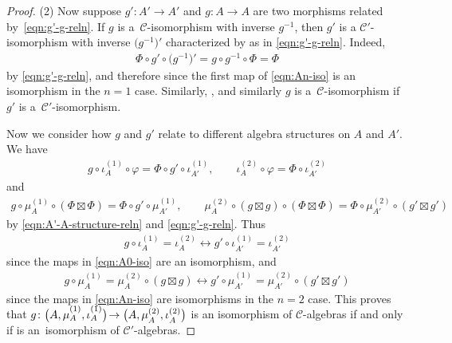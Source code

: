 \documentclass[10pt,a4paper]{amsart}
\begin{document}
\begin{proof}
(2) Now suppose $g'\colon A'\rightarrow A'$ and $g\colon A\rightarrow A$ are two morphisms related by~\eqref{eqn:g'-g-reln}. If $g$ is a~$\mathcal{C}$-isomorphism with inverse $g^{-1}$, then $g'$ is a $\mathcal{C}'$-isomorphism with inverse $\bigl(g^{-1}\bigr)'$ characterized by  as in \eqref{eqn:g'-g-reln}. Indeed,
\begin{gather*}
\Phi\circ g'\circ\bigl(g^{-1}\bigr)' =g\circ g^{-1}\circ\Phi =\Phi
\end{gather*}
by \eqref{eqn:g'-g-reln}, and therefore  since the first map of \eqref{eqn:An-iso} is an isomorphism in the $n=1$ case. Similarly, , and similarly $g$ is a~$\mathcal{C}$-isomorphism if $g'$ is a~$\mathcal{C}'$-isomorphism.

Now we consider how $g$ and $g'$ relate to different algebra structures on $A$ and $A'$. We have
\begin{gather*}
g\circ\iota^{(1)}_A\circ\varphi =\Phi\circ g'\circ\iota_{A'}^{(1)},\qquad \iota_{A}^{(2)}\circ\varphi =\Phi\circ\iota_{A'}^{(2)}
\end{gather*}
and
\begin{gather*}
g\circ\mu_A^{(1)}\circ(\Phi\boxtimes\Phi) =\Phi\circ g'\circ\mu_{A'}^{(1)},\qquad \mu_{A}^{(2)}\circ(g\boxtimes g)\circ(\Phi\boxtimes\Phi) =\Phi\circ\mu_{A'}^{(2)}\circ(g'\boxtimes g')
\end{gather*}
by \eqref{eqn:A'-A-structure-reln} and \eqref{eqn:g'-g-reln}. Thus
\begin{gather*}
g\circ\iota_A^{(1)}=\iota_A^{(2)}\longleftrightarrow g'\circ\iota_{A'}^{(1)} =\iota_{A'}^{(2)}
\end{gather*}
since the maps in \eqref{eqn:A0-iso} are an isomorphism, and
\begin{gather*}
g\circ\mu_A^{(1)}=\mu_A^{(2)}\circ(g\boxtimes g) \longleftrightarrow g'\circ\mu_{A'}^{(1)}=\mu_{A'}^{(2)}\circ(g'\boxtimes g')
\end{gather*}
since the maps in \eqref{eqn:An-iso} are isomorphisms in the $n=2$ case.
This proves that $g\colon \smash{\bigl(A,\mu\raisebox{1pt}{${}_A^{(1)}$},\iota\raisebox{1pt}{${}_A^{(1)}$}\bigr)}\!\rightarrow \smash{\bigl(A,\mu\raisebox{-1pt}{${}_A^{(2)}$}, \iota\raisebox{-1pt}{${}_A^{(2)}$}\bigr)}$ is an isomorphism of $\mathcal{C}$-algebras if and only if  is an~isomorphism of $\mathcal{C}'$-algebras.
\end{proof}
\end{document}
